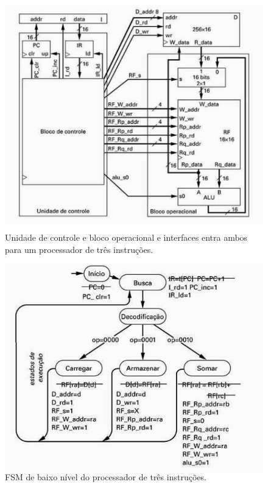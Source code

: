 \documentclass{article}
\begin{document}
\begin{figure}[h]
\centering
\begin{minipage}{0.48\textwidth}
    \centering 
    \includegraphics[width=1\textwidth]{operacionalecontrole3instr.jpg} 
    \caption{Unidade de controle e bloco operacional e interfaces entra ambos para um processador de três instruções.} 
    \label{fig:unidadeDeControleBlocoOperacional3Instr} 
     \hfill
\end{minipage}\hfill
\begin{minipage}{0.48\textwidth}
    \centering 
    \includegraphics[width=1\textwidth]{fsmBaixoNivel3Instr.jpg} 
    \caption{FSM de baixo nível do processador de três instruções.} 
    \label{fig:FSMbaixonivel3instr} 
\end{minipage}
\end{figure}
 
\end{document}
